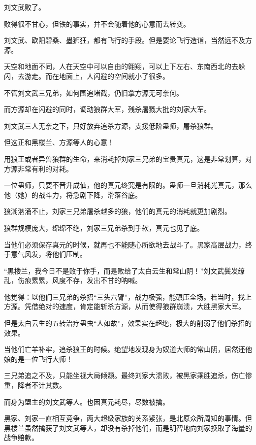 
\begin{this_body}



刘文武败了。

败得很不甘心，但铁的事实，并不会随着他的心意而去转变。

刘文武、欧阳碧桑、墨狮狂，都有飞行的手段。但是要论飞行造诣，当然远不及方源。

天空和地面不同，人在天空中可以自由的翱翔，可以上下左右、东南西北的去躲闪，去游走。而在地面上，人闪避的空间就小了很多。

不管刘文武三兄弟，如何围追堵截，仍旧拿方源无可奈何。

而方源却在闪避的同时，调动狼群大军，残杀屠戮大批的刘家大军。

刘文武三人无奈之下，只好放弃追杀方源，支援低阶蛊师，屠杀狼群。

但这正和黑楼兰、方源等人的心意！

用狼王或者异兽狼群的生命，来消耗掉刘家三兄弟的宝贵真元，这是非常划算，对方源非常有利的对耗。

一位蛊师，只要不晋升成仙，他的真元终究是有限的。蛊师一旦消耗光真元，那么他（她）的战斗力，将急剧下降，滑落谷底。

狼潮汹涌不止，刘家三兄弟屠杀越多的狼，他们的真元的消耗就更加剧烈。

狼群规模庞大，绵绵不绝，刘家三兄弟杀到手软，真元也见了底。

当他们必须保存真元的时候，就再也不能随心所欲地去战斗了。黑家高层战力，终于意气风发，将他们压制。

“黑楼兰，我今日不是败于你手，而是败给了太白云生和常山阴！”刘文武鬓发缭乱，伤痕累累，风度不存，发出不甘的呐喊。

他觉得：以他们三兄弟的杀招“三头六臂”，战力极强，能碾压全场。若当时，找上方源。凭借绝对的速度，肯定能斩杀方源，从而使得狼群崩溃，大胜黑家大军。

但是太白云生的五转治疗蛊虫“人如故”，效果实在超绝，极大的削弱了他们杀招的效果。

当他们亡羊补牢，追杀狼王的时候。绝望地发现身为奴道大师的常山阴，居然还他娘的是一位飞行大师！

三兄弟追之不及，只能坐视大局倾颓。最终刘家大溃败，被黑家乘胜追杀，伤亡惨重，降者不计其数。

而身为盟主的刘文武等人。也因真元耗尽，尽数被擒。

黑家、刘家一直相互竞争，两大超级家族的关系紧张，是北原众所周知的事情。但黑楼兰虽然擒获了刘文武等人，却没有杀掉他们，而是明智地向刘家换取了海量的战争赔款。


\end{this_body}
